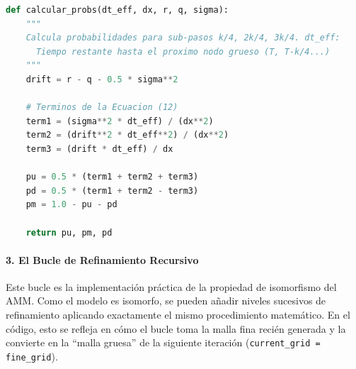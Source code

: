 \begin{lstlisting}[language=Python, caption={Cálculo dinámico de probabilidades para nodos de interfaz}] 
  def calcular_probs(dt_eff, dx, r, q, sigma): 
    """ 
    Calcula probabilidades para sub-pasos k/4, 2k/4, 3k/4. dt_eff: 
      Tiempo restante hasta el proximo nodo grueso (T, T-k/4...) 
    """ 
    drift = r - q - 0.5 * sigma**2

    # Terminos de la Ecuacion (12)
    term1 = (sigma**2 * dt_eff) / (dx**2)
    term2 = (drift**2 * dt_eff**2) / (dx**2)
    term3 = (drift * dt_eff) / dx

    pu = 0.5 * (term1 + term2 + term3)
    pd = 0.5 * (term1 + term2 - term3)
    pm = 1.0 - pu - pd

    return pu, pm, pd
\end{lstlisting}

\paragraph{3. El Bucle de Refinamiento Recursivo} 

Este bucle es la implementación práctica de la propiedad de isomorfismo del AMM. Como el modelo es isomorfo, se pueden añadir niveles sucesivos de refinamiento aplicando exactamente el mismo procedimiento matemático. En el código, esto se refleja en cómo el bucle toma la malla fina recién generada y la convierte en la ``malla gruesa'' de la siguiente iteración (\texttt{current\_grid = fine\_grid}).

